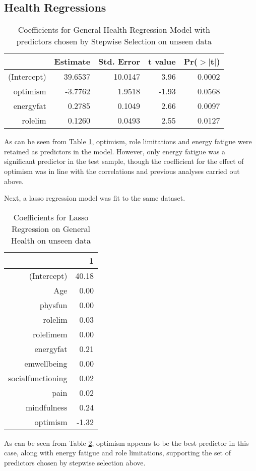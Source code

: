 \documentclass{article}
\begin{document}
\subsection{Health Regressions}




\begin{table}[ht]
\centering
\begin{tabular}{rrrrr}
  \hline
 & Estimate & Std. Error & t value & Pr($>$$|$t$|$) \\ 
  \hline
(Intercept) & 39.6537 & 10.0147 & 3.96 & 0.0002 \\ 
  optimism & -3.7762 & 1.9518 & -1.93 & 0.0568 \\ 
  energyfat & 0.2785 & 0.1049 & 2.66 & 0.0097 \\ 
  rolelim & 0.1260 & 0.0493 & 2.55 & 0.0127 \\ 
   \hline
\end{tabular}
\caption{Coefficients for General Health Regression Model with predictors chosen by Stepwise Selection on unseen data} 
\label{tab:hom1healthsteptest}
\end{table}As can be seen from Table \ref{tab:hom1healthsteptest}, optimism, role limitations and energy fatigue were retained as predictors in the model. However, only energy fatigue was a significant predictor in the test sample, though the coefficient for the effect of optimism was in line with the correlations and previous analyses carried out above. 

Next, a lasso regression model was fit to the same dataset. 


\begin{table}[ht]
\centering
\begin{tabular}{rr}
  \hline
 & 1 \\ 
  \hline
(Intercept) & 40.18 \\ 
  Age & 0.00 \\ 
  physfun & 0.00 \\ 
  rolelim & 0.03 \\ 
  rolelimem & 0.00 \\ 
  energyfat & 0.21 \\ 
  emwellbeing & 0.00 \\ 
  socialfunctioning & 0.02 \\ 
  pain & 0.02 \\ 
  mindfulness & 0.24 \\ 
  optimism & -1.32 \\ 
   \hline
\end{tabular}
\caption{Coefficients for Lasso Regression on General Health on unseen data} 
\label{tab:hom1healthlasso}
\end{table}
As can be seen from Table \ref{tab:hom1healthlasso}, optimism appears to be the best predictor in this case, along with energy fatigue and role limitations, supporting the set of predictors chosen by stepwise selection above. 
\end{document}
